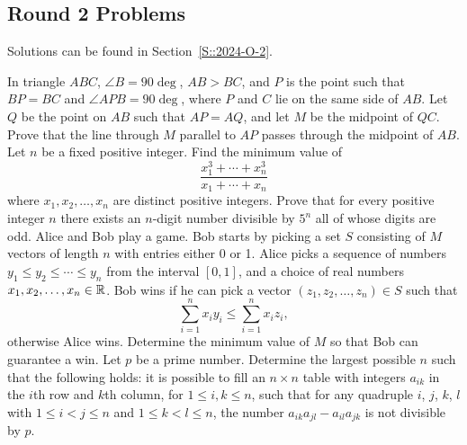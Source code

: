 \subsection{Round 2 Problems}
Solutions can be found in Section~\ref{S::2024-O-2}.

\begin{enumerate}
    \hyperrefitem[Q::2024-O-2-1] In triangle $ABC$, $\angle B = 90\deg$, $AB > BC$, and $P$ is the point such that $BP = BC$ and $\angle APB = 90\deg$, where $P$ and $C$ lie on the same side of $AB$. Let $Q$ be the point on $AB$ such that $AP = AQ$, and let $M$ be the midpoint of $QC$. Prove that the line through $M$ parallel to $AP$ passes through the midpoint of $AB$.
    \hyperrefitem[Q::2024-O-2-2] Let $n$ be a fixed positive integer. Find the minimum value of \[\frac{x_1^3 + \cdots + x_n^3}{x_1 + \cdots + x_n}\] where $x_1, x_2, \ldots, x_n$ are distinct positive integers.
    \hyperrefitem[Q::2024-O-2-3] Prove that for every positive integer $n$ there exists an $n$-digit number divisible by $5^n$ all of whose digits are odd.
    \hyperrefitem[Q::2024-O-2-4] Alice and Bob play a game. Bob starts by picking a set $S$ consisting of $M$ vectors of length $n$ with entries either 0 or 1. Alice picks a sequence of numbers $y_1 \leq y_2 \leq \cdots \leq y_n$ from the interval $[0, 1]$, and a choice of real numbers $x_1, x_2, \ldots, x_n \in \mathbb{R}$. Bob wins if he can pick a vector $(z_1, z_2, \ldots, z_n) \in S$ such that \[\sum_{i=1}^n x_i y_i \leq \sum_{i=1}^n x_i z_i,\] otherwise Alice wins. Determine the minimum value of $M$ so that Bob can guarantee a win.
    \hyperrefitem[Q::2024-O-2-5] Let $p$ be a prime number. Determine the largest possible $n$ such that the following holds: it is possible to fill an $n \times n$ table with integers $a_{ik}$ in the $i$th row and $k$th column, for $1 \leq i, k \leq n$, such that for any quadruple $i$, $j$, $k$, $l$ with $1 \leq i < j \leq n$ and $1 \leq k < l \leq n$, the number $a_{ik}a_{jl} - a_{il}a_{jk}$ is not divisible by $p$.
\end{enumerate}
